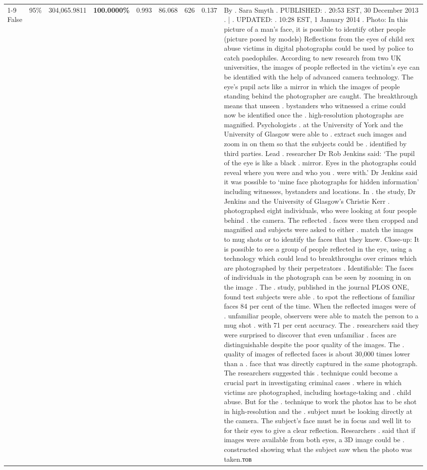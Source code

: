\begin{table}[H]
\begin{tabular}{lllrlllll}
\cline{1-9} \cline{2-9}
False & 95\% & 304,065.9811 & \bfseries \color{red} 100.0000\% & 0.993 & 86.068 & 626 & 0.137 & By . Sara Smyth . PUBLISHED: . 20:53 EST, 30 December 2013 . | . UPDATED: . 10:28 EST, 1 January 2014 . Photo: In this picture of a man's face, it is possible to identify other people (picture posed by models) Reflections from the eyes of child sex abuse victims in digital photographs could be used by police to catch paedophiles. According to new research from two UK universities, the images of people reflected in the victim's eye can be identified with the help of advanced camera technology. The eye's pupil acts like a mirror in which the images of people standing behind the photographer are caught. The breakthrough means that unseen . bystanders who witnessed a crime could now be identified once the . high-resolution photographs are magnified. Psychologists . at the University of York and the University of Glasgow were able to . extract such images and zoom in on them so that the subjects could be . identified by third parties. Lead . researcher Dr Rob Jenkins said: ‘The pupil of the eye is like a black . mirror. Eyes in the photographs could reveal where you were and who you . were with.' Dr Jenkins said it was possible to ‘mine face photographs for hidden information' including witnesses, bystanders and locations. In . the study, Dr Jenkins and the University of Glasgow's Christie Kerr . photographed eight individuals, who were looking at four people behind . the camera. The reflected . faces were then cropped and magnified and subjects were asked to either . match the images to mug shots or to identify the faces that they knew. Close-up: It is possible to see a group of people reflected in the eye, using a technology which could lead to breakthroughs over crimes which are photographed by their perpetrators . Identifiable: The faces of individuals in the photograph can be seen by zooming in on the image . The . study, published in the journal PLOS ONE, found test subjects were able . to spot the reflections of familiar faces 84 per cent of the time. When the reflected images were of . unfamiliar people, observers were able to match the person to a mug shot . with 71 per cent accuracy. The . researchers said they were surprised to discover that even unfamiliar . faces are distinguishable despite the poor quality of the images. The . quality of images of reflected faces is about 30,000 times lower than a . face that was directly captured in the same photograph. The researchers suggested this . technique could become a crucial part in investigating criminal cases . where in which victims are photographed, including hostage-taking and . child abuse. But for the . technique to work the photos has to be shot in high-resolution and the . subject must be looking directly at the camera. The subject's face must be in focus and well lit to for their eyes to give a clear reflection. Researchers . said that if images were available from both eyes, a 3D image could be . constructed showing what the subject saw when the photo was taken.тов \\

\end{tabular}
\end{table}
